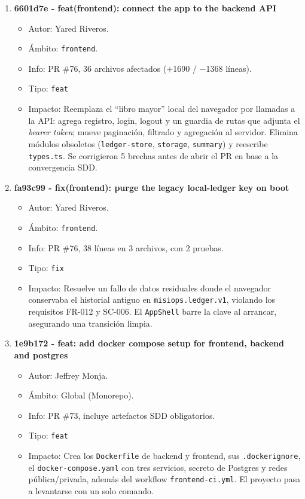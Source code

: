 \begin{enumerate}
    \item \textbf{6601d7e - feat(frontend): connect the app to the backend API}
          \begin{itemize}
              \item Autor: Yared Riveros.
              \item Ámbito: \texttt{frontend}.
              \item Info: PR \#76, 36 archivos afectados (+1690 / $-$1368 líneas).
              \item Tipo: \texttt{feat}
              \item Impacto: Reemplaza el ``libro mayor'' local del navegador por llamadas a la API: agrega registro, login, logout y un guardia de rutas que adjunta el \emph{bearer token}; mueve paginación, filtrado y agregación al servidor. Elimina módulos obsoletos (\texttt{ledger-store}, \texttt{storage}, \texttt{summary}) y reescribe \texttt{types.ts}. Se corrigieron 5 brechas antes de abrir el PR en base a la convergencia SDD.
          \end{itemize}

    \item \textbf{fa93c99 - fix(frontend): purge the legacy local-ledger key on boot}
          \begin{itemize}
              \item Autor: Yared Riveros.
              \item Ámbito: \texttt{frontend}.
              \item Info: PR \#76, 38 líneas en 3 archivos, con 2 pruebas.
              \item Tipo: \texttt{fix}
              \item Impacto: Resuelve un fallo de datos residuales donde el navegador conservaba el historial antiguo en \texttt{misiops.ledger.v1}, violando los requisitos FR-012 y SC-006. El \texttt{AppShell} barre la clave al arrancar, asegurando una transición limpia.
          \end{itemize}

    \item \textbf{1e9b172 - feat: add docker compose setup for frontend, backend and postgres}
          \begin{itemize}
              \item Autor: Jeffrey Monja.
              \item Ámbito: Global (Monorepo).
              \item Info: PR \#73, incluye artefactos SDD obligatorios.
              \item Tipo: \texttt{feat}
              \item Impacto: Crea los \texttt{Dockerfile} de backend y frontend, sus \texttt{.dockerignore}, el \texttt{docker\allowbreak-compose.yaml} con tres servicios, secreto de Postgres y redes pública/privada, además del workflow \texttt{frontend-ci.yml}. El proyecto pasa a levantarse con un solo comando.
          \end{itemize}


\end{enumerate}
